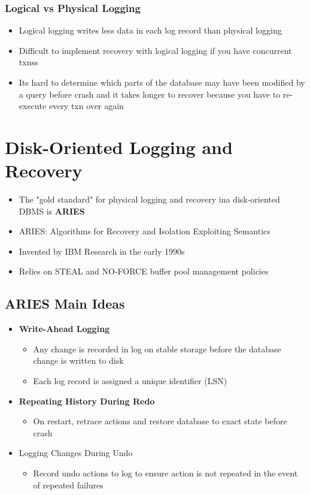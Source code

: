 \documentclass[11pt]{article}
\begin{document}
    \subsubsection*{Logical vs Physical Logging}
    \begin{itemize}
        \item Logical logging writes less data in each log record than physical logging
        \item Difficult to implement recovery with logical logging if you have concurrent txnss
        \item Its hard to determine which parts of the database may have been modified by a query before crash and it takes longer to recover because you have to re-execute every txn over again
    \end{itemize}

\section{Disk-Oriented Logging and Recovery}
\begin{itemize}
    \item The "gold standard" for physical logging and recovery ina  disk-oriented DBMS is \textbf{ARIES} ~\cite{p94-mohan}
    \item ARIES: Algorithms for Recovery and Isolation Exploiting Semantics
    \item Invented by IBM Research in the early 1990s
    \item Relies on STEAL and NO-FORCE buffer pool management policies
\end{itemize}

    \subsection*{ARIES Main Ideas}
    \begin{itemize}
        \item \textbf{Write-Ahead Logging}
        \begin{itemize}
            \item Any change is recorded in log on stable storage before the database change is written to disk
            \item Each log record is assigned a unique identifier (LSN)
        \end{itemize}
        \item \textbf{Repeating History During Redo}
        \begin{itemize}
            \item On restart, retrace actions and restore database to exact state before crash
        \end{itemize}
        \item Logging Changes During Undo
        \begin{itemize}
            \item Record undo actions to log to ensure action is not repeated in the event of repeated failures
        \end{itemize}
    \end{itemize}
\end{document}
